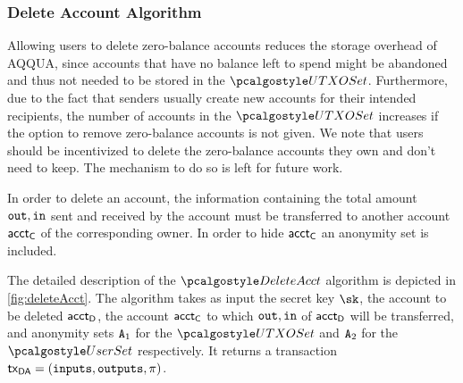 \subsubsection{Delete Account Algorithm}
Allowing users to delete zero-balance accounts reduces the storage overhead of AQQUA, since accounts that have no balance left to spend might be abandoned and thus not needed to be stored in the $\utxoset$. Furthermore, due to the fact that senders usually create new accounts for their intended recipients, the number of accounts in the $\utxoset$ increases if the option to remove zero-balance accounts is not given. We note that users should be incentivized to delete the zero-balance accounts they own and don't need to keep. The mechanism to do so is left for future work.

In order to delete an account, the information containing the total amount $\textup{\texttt{{out}}}, \textup{\texttt{{in}}}$ sent and received by the account must be transferred to another account $\textup{\textsf{acct}}_\textsf{C}$ of the corresponding owner. In order to hide $\textup{\textsf{acct}}_\textsf{C}$ an anonymity set is included. %

The detailed description of the $\deleteAcct$ algorithm is depicted in \autoref{fig:deleteAcct}. The algorithm takes as input the secret key $\sk$, the account to be deleted $\textup{\textsf{acct}}_\textsf{D}$, the account $\textup{\textsf{acct}}_\textsf{C}$ to which $\textup{\texttt{{out}}}, \textup{\texttt{{in}}}$ of $\textup{\textsf{acct}}_\textsf{D}$ will be transferred, and anonymity sets ${\mathtt{A}}_1$ for the $\utxoset$ and ${\mathtt{A}}_2$ for the $\usersset$ respectively. It returns a transaction $\textup{\textsf{tx}}_\textsf{DA} = ({\textup{\texttt{inputs}}}, {\textup{\texttt{outputs}}}, \pi)$.

